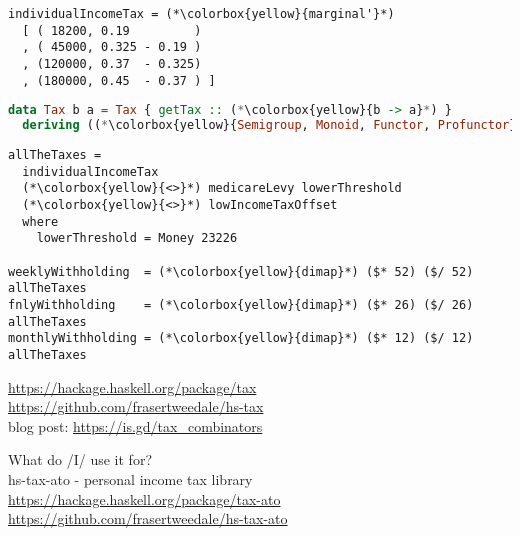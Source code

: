 \documentclass[ignorenonframetext,aspectratio=169,12pt]{beamer}
\begin{document}
\begin{frame}[fragile]
\center

\begin{lstlisting}
individualIncomeTax = (*\colorbox{yellow}{marginal'}*)
  [ ( 18200, 0.19         )
  , ( 45000, 0.325 - 0.19 )
  , (120000, 0.37  - 0.325)
  , (180000, 0.45  - 0.37 ) ]
\end{lstlisting}

\end{frame}


\begin{frame}[fragile]
\center

\begin{lstlisting}[language=Haskell]
data Tax b a = Tax { getTax :: (*\colorbox{yellow}{b -> a}*) }
  deriving ((*\colorbox{yellow}{Semigroup, Monoid, Functor, Profunctor}*))
\end{lstlisting}

\end{frame}

\begin{frame}[fragile]
\center

\begin{lstlisting}
allTheTaxes =
  individualIncomeTax
  (*\colorbox{yellow}{<>}*) medicareLevy lowerThreshold
  (*\colorbox{yellow}{<>}*) lowIncomeTaxOffset
  where
    lowerThreshold = Money 23226

weeklyWithholding  = (*\colorbox{yellow}{dimap}*) ($* 52) ($/ 52) allTheTaxes
fnlyWithholding    = (*\colorbox{yellow}{dimap}*) ($* 26) ($/ 26) allTheTaxes
monthlyWithholding = (*\colorbox{yellow}{dimap}*) ($* 12) ($/ 12) allTheTaxes
\end{lstlisting}

\end{frame}

\begin{frame}[plain]
\Large
\center
\ttfamily
\url{https://hackage.haskell.org/package/tax}\\
\bigskip
\url{https://github.com/frasertweedale/hs-tax}\\
\bigskip
blog post: \url{https://is.gd/tax_combinators}\\
\bigskip

\end{frame}



\begin{frame}[plain]
\Large
\center
\ttfamily
What do /I/ use it for?\\
\bigskip
hs-tax-ato - personal income tax library\\
\bigskip
\url{https://hackage.haskell.org/package/tax-ato}\\
\bigskip
\url{https://github.com/frasertweedale/hs-tax-ato}

\end{frame}
\end{document}
